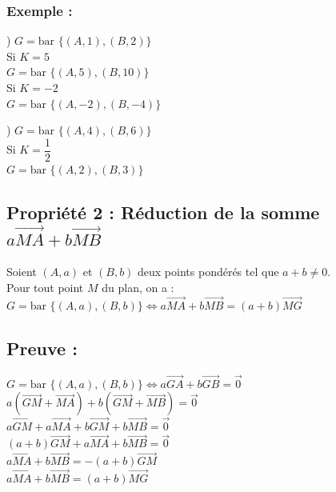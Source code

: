 \documentclass{article}
\begin{document}
\subsubsection*{Exemple :}

) $G = \text{bar } \{(A, 1), (B, 2)\}$ \\
Si $K = 5$ \\
$G = \text{bar } \{(A, 5), (B, 10)\}$ \\
Si $K = -2$ \\
$G = \text{bar } \{(A, -2), (B, -4)\}$

\vspace{1em}

) $G = \text{bar } \{(A, 4), (B, 6)\}$ \\
Si $K = \dfrac{1}{2}$ \\
$G = \text{bar } \{(A, 2), (B, 3)\}$

\vspace{2em}

\subsection*{Propriété 2 : Réduction de la somme $a\overrightarrow{MA} + b\overrightarrow{MB}$}

\noindent Soient $(A, a)$ et $(B, b)$ deux points pondérés tel que $a + b \neq 0$. \\
Pour tout point $M$ du plan, on a : \\
$G = \text{bar } \{(A, a), (B, b)\} \iff a\overrightarrow{MA} + b\overrightarrow{MB} = (a + b)\overrightarrow{MG}$

\subsection*{Preuve :}

\noindent $G = \text{bar } \{(A, a), (B, b)\} \iff a \overrightarrow{GA} + b \overrightarrow{GB} = \vec{0}$ \\
 $a (\overrightarrow{GM} + \overrightarrow{MA}) + b (\overrightarrow{GM} + \overrightarrow{MB}) = \vec{0}$ \\
 $a \overrightarrow{GM} + a \overrightarrow{MA} + b \overrightarrow{GM} + b \overrightarrow{MB} = \vec{0}$ \\
 $(a + b) \overrightarrow{GM} + a \overrightarrow{MA} + b \overrightarrow{MB} = \vec{0}$ \\
 $a \overrightarrow{MA} + b \overrightarrow{MB} = -(a + b) \overrightarrow{GM}$ \\
 $a \overrightarrow{MA} + b \overrightarrow{MB} = (a + b) \overrightarrow{MG}$
\end{document}
